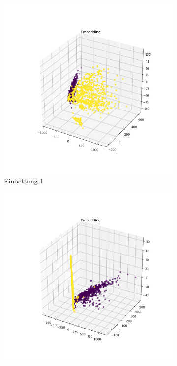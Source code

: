 	\begin{figure}[h]
		\centering
		\begin{subfigure}[c]{0.32\textwidth}			
			\includegraphics[width=1\textwidth,center]{src/AutoML/1/Embedding.png}
			\caption{Einbettung 1}
			\label{img:AutoMLEinbettungV1}	
		\end{subfigure}
		\begin{subfigure}[c]{0.32\textwidth}			
			\includegraphics[width=1\textwidth, center]{src/AutoML/2/Embedding.png}

\end{subfigure}
\end{figure}

